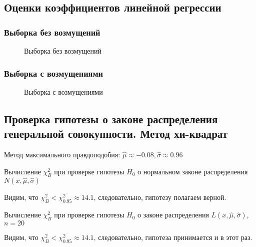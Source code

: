 \subsection{Оценки коэффициентов линейной регрессии}
\subsubsection{Выборка без возмущений}
\begin{flushleft}
	
\end{flushleft}
\begin{figure}[H]
	\caption{Выборка без возмущений}
	\label{fig:no_noise}
\end{figure}
\subsubsection{Выборка с возмущениями}
\begin{flushleft}
	
\end{flushleft}
\begin{figure}[H]
	\caption{Выборка с возмущениями}
	\label{fig:noise}
\end{figure}

\subsection{Проверка гипотезы о законе распределения генеральной совокупности. Метод хи-квадрат}
\begin{flushleft}
	Метод максимального правдоподобия: 
	$\hat{\mu} \approx -0.08, \hat{\sigma} \approx 0.96$\\
	\begin{table}[H]
		\centering
		
		\caption{ Вычисление $\chi^{2}_{B}$ при проверке гипотезы $H_{0}$ о нормальном законе распределения $N(x,\hat{\mu}, \hat{\sigma})$}
		\label{tab:normal_chi_2}
	\end{table}
	Видим, что $\chi^{2}_{B} < \chi^{2}_{0.95} \approx 14.1$, следовательно, гипотезу полагаем верной.\\
	\begin{table}[H]
		\centering
		
		\caption{Вычисление $\chi^{2}_{B}$ при проверке гипотезы $H_{0}$ о законе распределения $L(x,\hat{\mu}, \hat{\sigma})$, $n=20$}
		\label{tab:laplace_chi_2}
	\end{table}
	Видим, что $\chi^{2}_{B} < \chi^{2}_{0.95} \approx 14.1$, следовательно, гипотеза принимается и в этот раз.
\end{flushleft}

